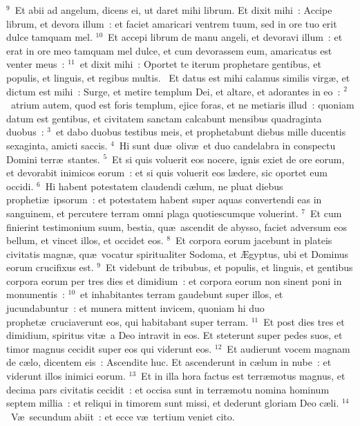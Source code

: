 ${}^{9}$~Et abii ad angelum, dicens ei, ut daret mihi librum. Et dixit mihi~: Accipe librum, et devora illum~: et faciet amaricari ventrem tuum, sed in ore tuo erit dulce tamquam mel.
${}^{10}$~Et accepi librum de manu angeli, et devoravi illum~: et erat in ore meo tamquam mel dulce, et cum devorassem eum, amaricatus est venter meus~:
${}^{11}$~et dixit mihi~: Oportet te iterum prophetare gentibus, et populis, et linguis, et regibus multis.
~Et datus est mihi calamus similis virg\ae , et dictum est mihi~: Surge, et metire templum Dei, et altare, et adorantes in eo~:
${}^{2}$~atrium autem, quod est foris templum, ejice foras, et ne metiaris illud~: quoniam datum est gentibus, et civitatem sanctam calcabunt mensibus quadraginta duobus~:
${}^{3}$~et dabo duobus testibus meis, et prophetabunt diebus mille ducentis sexaginta, amicti saccis.
${}^{4}$~Hi sunt du\ae\ oliv\ae\ et duo candelabra in conspectu Domini terr\ae\ stantes.
${}^{5}$~Et si quis voluerit eos nocere, ignis exiet de ore eorum, et devorabit inimicos eorum~: et si quis voluerit eos l\ae dere, sic oportet eum occidi.
${}^{6}$~Hi habent potestatem claudendi c\ae lum, ne pluat diebus propheti\ae\ ipsorum~: et potestatem habent super aquas convertendi eas in sanguinem, et percutere terram omni plaga quotiescumque voluerint.
${}^{7}$~Et cum finierint testimonium suum, bestia, qu\ae\ ascendit de abysso, faciet adversum eos bellum, et vincet illos, et occidet eos.
${}^{8}$~Et corpora eorum jacebunt in plateis civitatis magn\ae , qu\ae\ vocatur spiritualiter Sodoma, et \AE gyptus, ubi et Dominus eorum crucifixus est.
${}^{9}$~Et videbunt de tribubus, et populis, et linguis, et gentibus corpora eorum per tres dies et dimidium~: et corpora eorum non sinent poni in monumentis~:
${}^{10}$~et inhabitantes terram gaudebunt super illos, et jucundabuntur~: et munera mittent invicem, quoniam hi duo prophet\ae\ cruciaverunt eos, qui habitabant super terram.
${}^{11}$~Et post dies tres et dimidium, spiritus vit\ae\ a Deo intravit in eos. Et steterunt super pedes suos, et timor magnus cecidit super eos qui viderunt eos.
${}^{12}$~Et audierunt vocem magnam de c\ae lo, dicentem eis~: Ascendite huc. Et ascenderunt in c\ae lum in nube~: et viderunt illos inimici eorum.
${}^{13}$~Et in illa hora factus est terr\ae motus magnus, et decima pars civitatis cecidit~: et occisa sunt in terr\ae motu nomina hominum septem millia~: et reliqui in timorem sunt missi, et dederunt gloriam Deo c\ae li.
${}^{14}$~V\ae\ secundum abiit~: et ecce v\ae\ tertium veniet cito.


